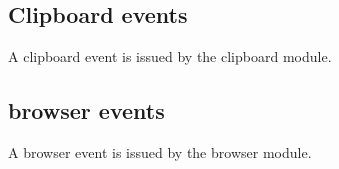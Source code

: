 \subsection{Clipboard \Glspl{event}}

A clipboard \gls{event} is issued by the clipboard \gls{module}.

\begin{itemize}
\end{itemize}

\subsection{\Gls{browser} \Glspl{event}}

A \gls{browser} \gls{event} is issued by the \gls{browser} \gls{module}.

